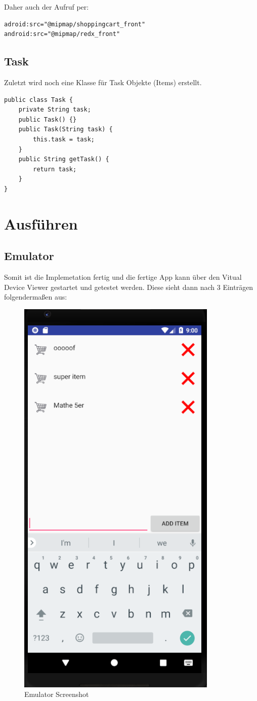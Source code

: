 Daher auch der Aufruf per:
\begin{lstlisting}
adroid:src="@mipmap/shoppingcart_front" 
android:src="@mipmap/redx_front"
\end{lstlisting}

\subsection{Task}
Zuletzt wird noch eine Klasse für Task Objekte (Items) erstellt.

\begin{lstlisting}
public class Task {
	private String task;
	public Task() {}
	public Task(String task) {
		this.task = task;
	}
	public String getTask() {
		return task;
	}
}
\end{lstlisting}
\clearpage
\section{Ausführen}
\subsection{Emulator}
Somit ist die Implemetation fertig und die fertige App kann über den Vitual Device Viewer gestartet und getestet werden. Diese sieht dann nach 3 Einträgen folgendermaßen aus:
\begin{figure}[!h]
	\centering
	\includegraphics[width=0.27\linewidth]{images/runemulator}
	\caption{Emulator Screenshot}
	\label{fig:runemulator}
\end{figure}
\clearpage
